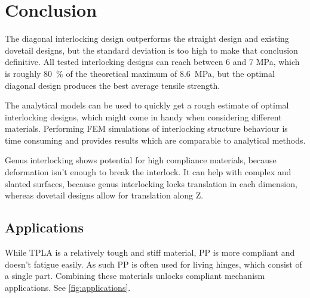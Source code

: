 \section{Conclusion}
The diagonal interlocking design outperforms the straight design and existing dovetail designs,
but the standard deviation is too high to make that conclusion definitive.
All tested interlocking designs can reach between 6 and 7 \si{\mega\pascal}, which is roughly \SI{80}{\percent} of the theoretical maximum of \SI{8.6}{\mega\pascal},
but the optimal diagonal design produces the best average tensile strength.

The analytical models can be used to quickly get a rough estimate of optimal interlocking designs,
which might come in handy when considering different materials.
Performing FEM simulations of interlocking structure behaviour is time consuming and provides results which are comparable to analytical methods.

Genus interlocking shows potential for high compliance materials, because deformation isn't enough to break the interlock.
It can help with complex and slanted surfaces, because genus interlocking locks translation in each dimension, 
whereas dovetail designs allow for translation along Z.



\subsection{Applications}
While TPLA is a relatively tough and stiff material, PP is more compliant and doesn't fatigue easily.
As such PP is often used for living hinges, which consist of a single part.
Combining these materials unlocks compliant mechanism applications.
See \cref{fig:applications}.


